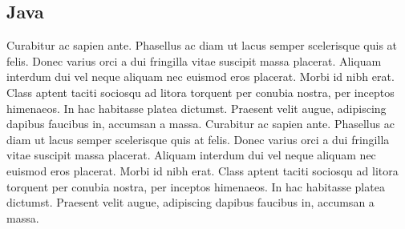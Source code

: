 \subsection{Java} Curabitur ac sapien ante. Phasellus ac diam ut lacus semper scelerisque quis at felis. Donec varius orci a dui fringilla vitae suscipit massa placerat. Aliquam interdum dui vel neque aliquam nec euismod eros placerat. Morbi id nibh erat. Class aptent taciti sociosqu ad litora torquent per conubia nostra, per inceptos himenaeos. In hac habitasse platea dictumst. Praesent velit augue, adipiscing dapibus faucibus in, accumsan a massa.
Curabitur ac sapien ante. Phasellus ac diam ut lacus semper scelerisque quis at felis. Donec varius orci a dui fringilla vitae suscipit massa placerat. Aliquam interdum dui vel neque aliquam nec euismod eros placerat. Morbi id nibh erat. Class aptent taciti sociosqu ad litora torquent per conubia nostra, per inceptos himenaeos. In hac habitasse platea dictumst. Praesent velit augue, adipiscing dapibus faucibus in, accumsan a massa.
